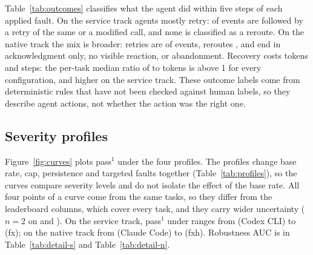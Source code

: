 Table~\ref{tab:outcomes} classifies what the agent did within five steps of each applied fault.
On the service track agents mostly retry: \cmcaTrackSRetryShare{} of \cmcaTrackSEvents{} events are followed by a retry of the same or a modified call, and none is classified as a reroute.
On the native track the mix is broader: retries are \cmcaTrackNFixedRetryShare{} of \cmcaTrackNFixedEvents{} events, reroutes \cmcaTrackNFixedRerouteShare{}, and \cmcaTrackNFixedPassiveShare{} end in acknowledgment only, no visible reaction, or abandonment.
Recovery costs tokens and steps: the per-task median ratio of  to  tokens is above 1 for every configuration, and higher on the service track.
These outcome labels come from deterministic rules that have not been checked against human labels, so they describe agent actions, not whether the action was the right one.

\begin{table}[t]
\centering
\scriptsize
{}
\caption{Fault-event outcomes under  (shares of classified events), duplicate side effects after a targeted false failure (trials with a duplicate over trials with a false failure; service track only), and per-task median ratios of  to  tokens and agent steps.}
\label{tab:outcomes}
\end{table}

\subsection{Severity profiles}

Figure~\ref{fig:curves} plots pass$^1$ under the four profiles.
The profiles change base rate, cap, persistence and targeted faults together (Table~\ref{tab:profiles}), so the curves compare severity levels and do not isolate the effect of the base rate.
All four points of a curve come from the same \cmcaTrackSCurveTasks{} tasks, so they differ from the leaderboard columns, which cover every task, and they carry wider uncertainty ($n = 2$ on  and ).
On the service track, pass$^1$ under  ranges from \cmcaTrackSCodexClaudeCurveHeavy{} (Codex CLI) to \cmcaTrackSFxClaudeCurveHeavy{} (fx); on the native track from \cmcaTrackNFixedCcClaudeCurveHeavy{} (Claude Code) to \cmcaTrackNFixedFxhClaudeCurveHeavy{} (fxh).
Robustness AUC is in Table~\ref{tab:detail-s} and Table~\ref{tab:detail-n}.

